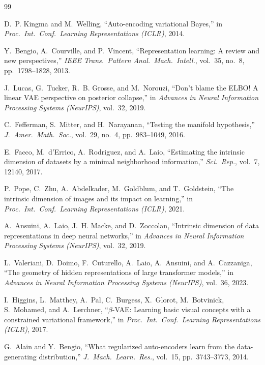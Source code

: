 \documentclass[11pt,a4paper]{jsarticle}
\begin{document}
\begin{thebibliography}{99}

D.~P. Kingma and M.~Welling,
``Auto-encoding variational Bayes,''
in \textit{Proc.\ Int.\ Conf.\ Learning Representations (ICLR)}, 2014.

Y.~Bengio, A.~Courville, and P.~Vincent,
``Representation learning: A review and new perspectives,''
\textit{IEEE Trans.\ Pattern Anal.\ Mach.\ Intell.}, vol.~35, no.~8,
pp.~1798--1828, 2013.

J.~Lucas, G.~Tucker, R.~B. Grosse, and M.~Norouzi,
``Don't blame the ELBO! A linear VAE perspective on posterior collapse,''
in \textit{Advances in Neural Information Processing Systems (NeurIPS)},
vol.~32, 2019.

C.~Fefferman, S.~Mitter, and H.~Narayanan,
``Testing the manifold hypothesis,''
\textit{J.\ Amer.\ Math.\ Soc.}, vol.~29, no.~4, pp.~983--1049, 2016.

E.~Facco, M.~d'Errico, A.~Rodriguez, and A.~Laio,
``Estimating the intrinsic dimension of datasets by a minimal neighborhood
information,''
\textit{Sci.\ Rep.}, vol.~7, 12140, 2017.

P.~Pope, C.~Zhu, A.~Abdelkader, M.~Goldblum, and T.~Goldstein,
``The intrinsic dimension of images and its impact on learning,''
in \textit{Proc.\ Int.\ Conf.\ Learning Representations (ICLR)}, 2021.

A.~Ansuini, A.~Laio, J.~H. Macke, and D.~Zoccolan,
``Intrinsic dimension of data representations in deep neural networks,''
in \textit{Advances in Neural Information Processing Systems (NeurIPS)},
vol.~32, 2019.

L.~Valeriani, D.~Doimo, F.~Cuturello, A.~Laio, A.~Ansuini, and A.~Cazzaniga,
``The geometry of hidden representations of large transformer models,''
in \textit{Advances in Neural Information Processing Systems (NeurIPS)},
vol.~36, 2023.

I.~Higgins, L.~Matthey, A.~Pal, C.~Burgess, X.~Glorot, M.~Botvinick,
S.~Mohamed, and A.~Lerchner,
``$\beta$-VAE: Learning basic visual concepts with a constrained variational
framework,''
in \textit{Proc.\ Int.\ Conf.\ Learning Representations (ICLR)}, 2017.

G.~Alain and Y.~Bengio,
``What regularized auto-encoders learn from the data-generating
distribution,''
\textit{J.\ Mach.\ Learn.\ Res.}, vol.~15, pp.~3743--3773, 2014.


\end{thebibliography}
\end{document}
